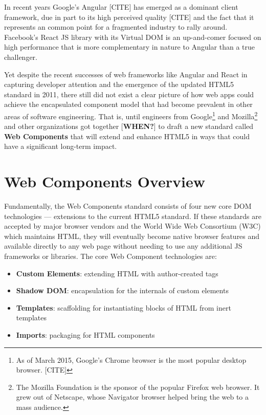 In recent years Google's Angular [CITE] 
has emerged as a dominant client framework, 
due in part to its high perceived quality [CITE] and the fact that it represents an common point for a fragmented industry to rally around.
Facebook's React 
JS library with its Virtual DOM is an up-and-comer focused on high performance that is more complementary in nature to Angular than a true challenger.

Yet despite the recent successes of web frameworks like Angular and React in capturing developer attention and the emergence of the updated HTML5 standard in 2011, 
there still did not exist a clear picture of how web apps could achieve the encapsulated component model that had become prevalent in other areas of software engineering.
That is, until engineers from Google\footnote{
As of March 2015, Google's Chrome browser is the most popular desktop browser. [CITE]}
and Mozilla\footnote{
The Mozilla Foundation is the sponsor of the popular Firefox web browser. It grew out of Netscape, whose Navigator browser helped bring the web to a mass audience.}
and other organizations got together [\textbf{WHEN?}] to draft a new standard called \textbf{Web Components} that will extend and enhance HTML5 in ways that could have a significant long-term impact.

\section{Web Components Overview}
Fundamentally, the Web Components standard consists of four new core DOM technologies --- extensions to the current HTML5 standard.
If these standards are accepted by major browser vendors and the World Wide Web Consortium (W3C)
which maintains HTML, 
they will eventually become native browser features and available directly to any web page without needing to use any additional JS frameworks or libraries. 
The core Web Component technologies are:
\begin{itemize}
\item
\textbf{Custom Elements}: extending HTML with author-created tags
\item
\textbf{Shadow DOM}: encapsulation for the internals of custom elements
\item
\textbf{Templates}: scaffolding for instantiating blocks of HTML from inert templates
\item
\textbf{Imports}: packaging for HTML components
\end{itemize}

